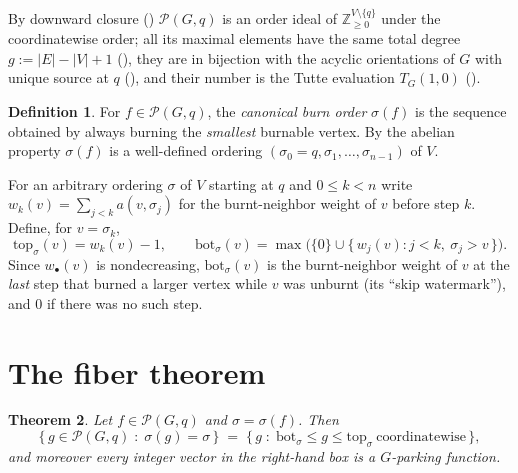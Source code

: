 \documentclass[11pt]{amsart}
\newtheorem{theorem}{Theorem}[section]
\theoremstyle{definition}
\newtheorem{definition}[theorem]{Definition}
\newcommand{\PF}{\mathcal{P}}
\newcommand{\ZZ}{\mathbb{Z}}
\newcommand{\bott}[1]{\mathrm{bot}_{#1}}
\newcommand{\topp}[1]{\mathrm{top}_{#1}}
\begin{document}
By downward closure (\cite[Prop.~2.2]{bct}) $\PF(G,q)$ is an order ideal of
$\ZZ_{\ge 0}^{V \setminus \{q\}}$ under the coordinatewise order; all its
maximal elements have the same total degree $g := |E|-|V|+1$
(\cite[Cor.~3.2]{bct}), they are in bijection with the acyclic orientations
of $G$ with unique source at $q$ (\cite[Thm.~3.1]{bct}), and their number is
the Tutte evaluation $T_G(1,0)$ (\cite[Thm.~4.1]{bct}).

\begin{definition}\label{def:canon}
For $f \in \PF(G,q)$, the \emph{canonical burn order} $\sigma(f)$ is the
sequence obtained by always burning the \emph{smallest} burnable vertex.
By the abelian property $\sigma(f)$ is a well-defined ordering
$(\sigma_0=q,\sigma_1,\dots,\sigma_{n-1})$ of $V$.
\end{definition}

For an arbitrary ordering $\sigma$ of $V$ starting at $q$ and $0\le k<n$
write $w_k(v) = \sum_{j<k} a(v,\sigma_j)$ for the burnt-neighbor weight of
$v$ before step $k$. Define, for $v=\sigma_k$,
\[
  \topp{\sigma}(v) = w_k(v) - 1,
  \qquad
  \bott{\sigma}(v) = \max\bigl(\{0\} \cup \{\, w_j(v) : j<k,\ \sigma_j > v \,\}\bigr).
\]
Since $w_\bullet(v)$ is nondecreasing, $\bott{\sigma}(v)$ is the
burnt-neighbor weight of $v$ at the \emph{last} step that burned a larger
vertex while $v$ was unburnt (its ``skip watermark''), and $0$ if there was
no such step.

\section{The fiber theorem}

\begin{theorem}\label{thm:fiber}
Let $f \in \PF(G,q)$ and $\sigma = \sigma(f)$. Then
\[
  \{\, g \in \PF(G,q) \;:\; \sigma(g) = \sigma \,\}
  \;=\;
  \{\, g \;:\; \bott{\sigma} \le g \le \topp{\sigma} \ \text{coordinatewise} \,\},
\]
and moreover every integer vector in the right-hand box is a $G$-parking
function.
\end{theorem}
\end{document}
